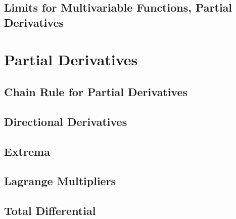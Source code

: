 \subsection{Limits for Multivariable Functions, Partial Derivatives}

\section{Partial Derivatives}
\subsection{Chain Rule for Partial Derivatives}

\subsection{Directional Derivatives}

\subsection{Extrema}

\subsection{Lagrange Multipliers}

\subsection{Total Differential}

